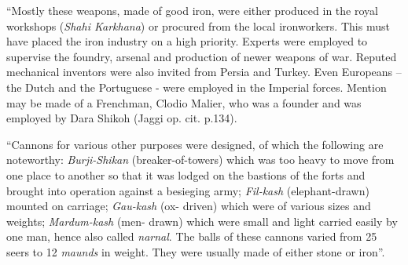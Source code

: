 “Mostly these weapons, made of good iron,  were either produced in the royal workshops ({\it Shahi Karkhana}) or procured from the local ironworkers. This must have placed the iron industry on a high priority. Experts were employed to supervise the foundry, arsenal and production of newer weapons of war. Reputed mechanical inventors were also invited from Persia and Turkey. Even Europeans – the Dutch and the Portuguese - were employed in the Imperial forces. Mention may be made of a Frenchman, Clodio Malier, who was a founder and was employed by Dara Shikoh (Jaggi op. cit. p.134).

“Cannons for various other purposes were designed, of which the following are noteworthy: {\it Burji-Shikan} (breaker-of-towers) which was too heavy to move from one place to another so that it was lodged on the bastions of the forts and brought into operation against a besieging army; {\it Fil-kash} (elephant-drawn) mounted on carriage; {\it Gau-kash} (ox- driven) which were of various sizes and weights; {\it Mardum-kash} (men- drawn) which were small and light carried easily by one man, hence also called {\it narnal}. The balls of these cannons varied from 25 seers to 12 {\it maunds} in weight. They were usually made of either stone or iron”. 

